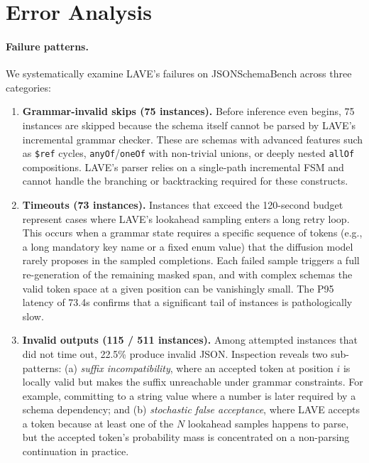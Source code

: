 \section{Error Analysis}

\paragraph{Failure patterns.}
We systematically examine LAVE’s failures on JSONSchemaBench across three categories:

\begin{enumerate}
    \item \textbf{Grammar-invalid skips (75 instances).} Before inference even begins, 75 instances are skipped because the schema itself cannot be parsed by LAVE’s incremental grammar checker. These are schemas with advanced features such as \texttt{\$ref} cycles, \texttt{anyOf}/\texttt{oneOf} with non-trivial unions, or deeply nested \texttt{allOf} compositions. LAVE’s parser relies on a single-path incremental FSM and cannot handle the branching or backtracking required for these constructs.

    \item \textbf{Timeouts (73 instances).} Instances that exceed the 120-second budget represent cases where LAVE’s lookahead sampling enters a long retry loop. This occurs when a grammar state requires a specific sequence of tokens (e.g., a long mandatory key name or a fixed enum value) that the diffusion model rarely proposes in the sampled completions. Each failed sample triggers a full re-generation of the remaining masked span, and with complex schemas the valid token space at a given position can be vanishingly small. The P95 latency of 73.4s confirms that a significant tail of instances is pathologically slow.

    \item \textbf{Invalid outputs (115 / 511 instances).} Among attempted instances that did not time out, 22.5\% produce invalid JSON. Inspection reveals two sub-patterns: (a) \emph{suffix incompatibility}, where an accepted token at position $i$ is locally valid but makes the suffix unreachable under grammar constraints. For example, committing to a string value where a number is later required by a schema dependency; and (b) \emph{stochastic false acceptance}, where LAVE accepts a token because at least one of the $N$ lookahead samples happens to parse, but the accepted token’s probability mass is concentrated on a non-parsing continuation in practice.
\end{enumerate}

